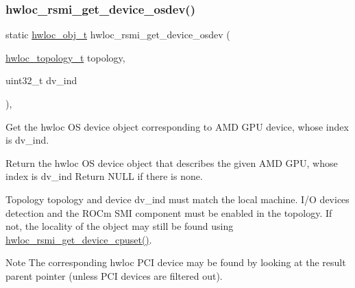 \subsubsection{\texorpdfstring{hwloc\+\_\+rsmi\+\_\+get\+\_\+device\+\_\+osdev()}{hwloc\_rsmi\_get\_device\_osdev()}}
{\footnotesize\ttfamily static \hyperlink{a00185_ga79b8ab56877ef99ac59b833203391c7d}{hwloc\+\_\+obj\+\_\+t} hwloc\+\_\+rsmi\+\_\+get\+\_\+device\+\_\+osdev (\begin{DoxyParamCaption}\item[{\hyperlink{a00186_ga9d1e76ee15a7dee158b786c30b6a6e38}{hwloc\+\_\+topology\+\_\+t}}]{topology,  }\item[{uint32\+\_\+t}]{dv\+\_\+ind }\end{DoxyParamCaption})\hspace{0.3cm}{\ttfamily [inline]}, {\ttfamily [static]}}



Get the hwloc OS device object corresponding to A\+MD G\+PU device, whose index is {\ttfamily dv\+\_\+ind}. 

Return the hwloc OS device object that describes the given A\+MD G\+PU, whose index is {\ttfamily dv\+\_\+ind} Return N\+U\+LL if there is none.

Topology {\ttfamily topology} and device {\ttfamily dv\+\_\+ind} must match the local machine. I/O devices detection and the R\+O\+Cm S\+MI component must be enabled in the topology. If not, the locality of the object may still be found using \hyperlink{a00222_gaf939e697e3769c3524255318262b9c29}{hwloc\+\_\+rsmi\+\_\+get\+\_\+device\+\_\+cpuset()}.

\begin{DoxyNote}{Note}
The corresponding hwloc P\+CI device may be found by looking at the result parent pointer (unless P\+CI devices are filtered out). 
\end{DoxyNote}
\mbox{\label{a00222_ga507d0acdd5e9ac374a8d120d59604c80}} 
